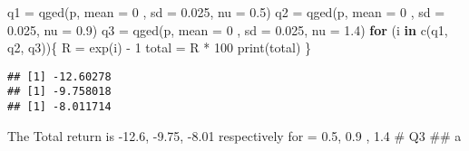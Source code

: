 \documentclass[
]{article}
\newenvironment{Shaded}{\begin{snugshade}}{\end{snugshade}}
\newcommand{\AttributeTok}[1]{\textcolor[rgb]{0.77,0.63,0.00}{#1}}
\newcommand{\ControlFlowTok}[1]{\textcolor[rgb]{0.13,0.29,0.53}{\textbf{#1}}}
\newcommand{\DecValTok}[1]{\textcolor[rgb]{0.00,0.00,0.81}{#1}}
\newcommand{\FloatTok}[1]{\textcolor[rgb]{0.00,0.00,0.81}{#1}}
\newcommand{\FunctionTok}[1]{\textcolor[rgb]{0.00,0.00,0.00}{#1}}
\newcommand{\NormalTok}[1]{#1}
\newcommand{\OtherTok}[1]{\textcolor[rgb]{0.56,0.35,0.01}{#1}}
\newcommand{\SpecialCharTok}[1]{\textcolor[rgb]{0.00,0.00,0.00}{#1}}
\begin{document}
\begin{Shaded}
\begin{Highlighting}[]
\NormalTok{q1 }\OtherTok{=} \FunctionTok{qged}\NormalTok{(p, }\AttributeTok{mean =} \DecValTok{0}\NormalTok{ , }\AttributeTok{sd =}  \FloatTok{0.025}\NormalTok{, }\AttributeTok{nu =} \FloatTok{0.5}\NormalTok{)}
\NormalTok{q2 }\OtherTok{=} \FunctionTok{qged}\NormalTok{(p, }\AttributeTok{mean =} \DecValTok{0}\NormalTok{ , }\AttributeTok{sd =}  \FloatTok{0.025}\NormalTok{, }\AttributeTok{nu =} \FloatTok{0.9}\NormalTok{)}
\NormalTok{q3 }\OtherTok{=} \FunctionTok{qged}\NormalTok{(p, }\AttributeTok{mean =} \DecValTok{0}\NormalTok{ , }\AttributeTok{sd =}  \FloatTok{0.025}\NormalTok{, }\AttributeTok{nu =} \FloatTok{1.4}\NormalTok{)}
\ControlFlowTok{for}\NormalTok{ (i }\ControlFlowTok{in} \FunctionTok{c}\NormalTok{(q1, q2, q3))\{}
\NormalTok{  R }\OtherTok{=} \FunctionTok{exp}\NormalTok{(i) }\SpecialCharTok{{-}} \DecValTok{1}
\NormalTok{  total }\OtherTok{=}\NormalTok{ R }\SpecialCharTok{*}  \DecValTok{100}
  \FunctionTok{print}\NormalTok{(total)}
\NormalTok{\}}
\end{Highlighting}
\end{Shaded}

\begin{verbatim}
## [1] -12.60278
## [1] -9.758018
## [1] -8.011714
\end{verbatim}

The Total return is -12.6, -9.75, -8.01 respectively for \nu = 0.5, 0.9
, 1.4 \# Q3 \#\# a
\end{document}
